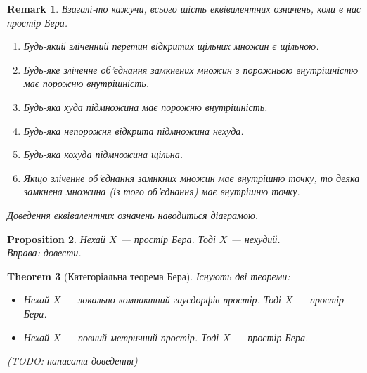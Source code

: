 \documentclass[a4paper, 10pt]{article}
\theoremstyle{theoremdd}
\newtheorem{theorem}{Theorem}[subsection]
\newtheorem{proposition}[theorem]{Proposition}
\newtheorem{remark}[theorem]{Remark}
\begin{document}
\begin{remark}
Взагалі-то кажучи, всього шість еквівалентних означень, коли в нас простір Бера.
\begin{enumerate}[nosep,wide=0pt,label={\arabic*)}]
\item Будь-який зліченний перетин відкритих щільних множин є щільною.
\item Будь-яке зліченне об'єднання замкнених множин з порожньою внутрішністю має порожню внутрішність.
\item Будь-яка худа підмножина має порожню внутрішність.
\item Будь-яка непорожня відкрита підмножина нехуда.
\item Будь-яка кохуда підмножина щільна.
\item Якщо зліченне об'єднання замнкних множин має внутрішню точку, то деяка замкнена множина (із того об'єднання) має внутрішню точку.
\end{enumerate}
Доведення еквівалентних означень наводиться діаграмою.
\begin{figure}[H]
\centering
{}
\end{figure}
\end{remark}

\begin{proposition}
Нехай $X$ --- простір Бера. Тоді $X$ --- нехудий.\\
\textit{Вправа: довести}.
\end{proposition}

\begin{theorem}[Категоріальна теорема Бера]
Існують дві теореми:
\begin{itemize}[wide=0pt]
\item Нехай $X$ --- локально компактний гаусдорфів простір. Тоді $X$ --- простір Бера.

\item Нехай $X$ --- повний метричний простір. Тоді $X$ --- простір Бера.
\end{itemize}
(TODO: написати доведення)
\end{theorem}
\end{document}

